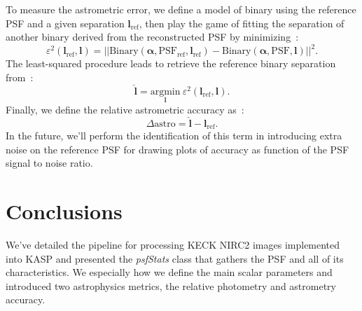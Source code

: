 \documentclass[12pt]{article}
\newcommand{\norme}[1]{\left\vert\left\vert #1 \right\vert\right\vert}
\newcommand{\para}[1]{\left(#1\right)}
\begin{document}
To measure the astrometric error, we define a model of binary using the reference PSF and a given separation $\boldsymbol{l}_\text{ref}$, then play the game of fitting the separation of another binary derived from the reconstructed PSF by minimizing~:
\begin{equation}
\varepsilon^2\para{\boldsymbol{l}_\text{ref},\boldsymbol{l}} = \norme{\text{Binary}\para{\boldsymbol{\alpha},\text{PSF}_\text{ref},\boldsymbol{l}_\text{ref}} - \text{Binary}\para{\boldsymbol{\alpha},\text{PSF},\boldsymbol{l}}}^2.
\end{equation}
The least-squared procedure leads to retrieve the reference binary separation from~:
\begin{equation}
\widehat{\boldsymbol{l}} = \underset{\boldsymbol{l}}{\text{argmin}} \: \varepsilon^2\para{\boldsymbol{l}_\text{ref},\boldsymbol{l}}.
\end{equation}
Finally, we define the relative astrometric accuracy as~:
\begin{equation}
	\Delta \text{astro} = {\widehat{\boldsymbol{l}} - \boldsymbol{l}_\text{ref}}.
\end{equation}
In the future, we'll perform the identification of this term in introducing extra noise on the reference PSF for drawing plots of accuracy as function of the PSF signal to noise ratio.

\section{Conclusions}

We've detailed the pipeline for processing KECK NIRC2 images implemented into KASP and presented the \emph{psfStats} class that gathers the PSF and all of its characteristics. We especially how we define the main scalar parameters and introduced two astrophysics metrics, the relative photometry and astrometry accuracy.


 

\end{document}
